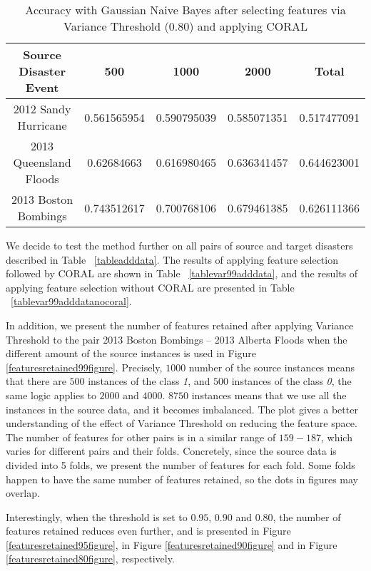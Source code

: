 \begin{table}[ht]
    \begin{center}
    \caption{Accuracy with Gaussian Naive Bayes after selecting features via Variance Threshold (0.80) and applying CORAL}
    \begin{tabular}[c]{|c|c|c|c|c|}
        \hline
        Source Disaster Event & 500 & 1000 & 2000 & Total \\
        \hline
        2012 Sandy Hurricane & 0.561565954 & 0.590795039 & 0.585071351 & 0.517477091 \\
        2013 Queensland Floods & 0.62684663 & 0.616980465 & 0.636341457 & 0.644623001 \\
        2013 Boston Bombings & 0.743512617 & 0.700768106 & 0.679461385 & 0.626111366 \\
        \hline
    \end{tabular}
    \label{tablevar8}
   \end{center}
\end{table}

We decide to test the method further on all pairs of source and target disasters described in Table ~\ref{tableadddata}. The results of applying feature selection followed by CORAL are shown in Table ~\ref{tablevar99adddata}, and the results of applying feature selection without CORAL are presented in Table ~\ref{tablevar99adddatanocoral}. 

In addition, we present the number of features retained after applying Variance Threshold to the pair 2013 Boston Bombings -- 2013 Alberta Floods when the different amount of the source instances is used in Figure \ref{featuresretained99figure}. Precisely, $1000$ number of the source instances means that there are $500$ instances of the class \textit{1}, and $500$ instances of the class \textit{0}, the same logic applies to $2000$ and $4000$. $8750$ instances means that we use all the instances in the source data, and it becomes imbalanced. The plot gives a better understanding of the effect of Variance Threshold on reducing the feature space. The number of features for other pairs is in a similar range of $159-187$, which varies for different pairs and their folds. Concretely, since the source data is divided into 5 folds, we present the number of features for each fold. Some folds happen to have the same number of features retained, so the dots in figures may overlap.

Interestingly, when the threshold is set to $0.95$, $0.90$ and $0.80$, the number of features retained reduces even further, and is presented in Figure \ref{featuresretained95figure}, in Figure \ref{featuresretained90figure} and in Figure \ref{featuresretained80figure}, respectively. 


